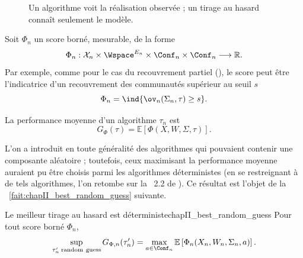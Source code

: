\begin{figure}[H]
\centering
{}
\caption{Un algorithme voit la réalisation observée ; un tirage au hasard connaît seulement le modèle. }
\label{fig:chapII_algo_vs_guess}
\end{figure}


Soit $\Phi_n$ un score borné, mesurable, de la forme
\[
    \Phi_n:\mathcal X_n\times \Wspace^{E_n}\times\Conf_n\times\Conf_n\longrightarrow\mathbb R.
\]
Par exemple, comme pour le cas du recouvrement partiel (), le score peut être l'indicatrice d'un recouvrement des communautés supérieur au seuil $s$
\[
\Phi_n = \ind{\ov_n(\Sigma_n,\tau)\ge s}.
\]

La performance moyenne d'un algorithme $\tau_n$ est
\begin{equation}
    G_{\Phi}(\tau)
    =
    \mathbb E\left[\Phi(X,W,\Sigma,\tau)\right].
    \label{eq:chapII_score_general}
\end{equation}

L'on a introduit en toute généralité des algorithmes qui pouvaient contenir une composante aléatoire ; toutefois, ceux maximisant la performance moyenne auraient pu être choisis parmi les algorithmes déterministes (en se restreignant à de tels algorithmes, l'on retombe sur la \Def~2.2 de \SB{} \cite{SankararamanBaccelli2018}).
Ce résultat est l'objet de la \Fact~\ref{fait:chapII_best_random_guess} suivante.

\begin{Fait}{Le meilleur tirage au hasard est déterministe}{chapII_best_random_guess}
Pour tout score borné $\Phi_n$,
\begin{equation}
    \sup_{\tau_n'\;\mathrm{random\ guess}}G_{\Phi,n}(\tau_n')
    =
    \max_{a\in\Conf_n}
    \mathbb E\left[\Phi_n(X_n,W_n,\Sigma_n,a)\right].
    \label{eq:chapII_best_guess_deterministe}
\end{equation}

\end{Fait}

